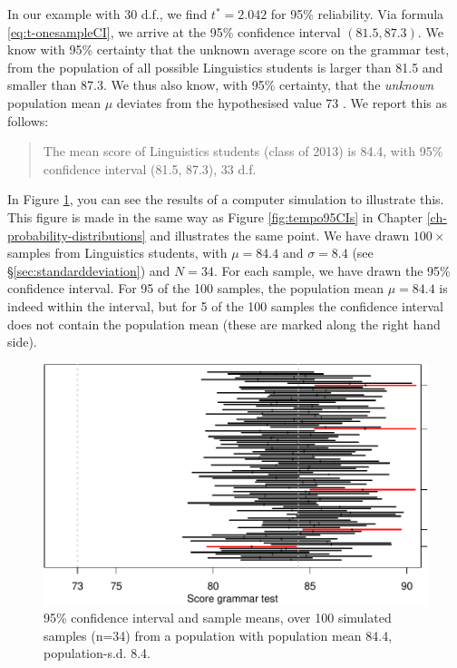\documentclass[
]{book}
\begin{document}
In our example with 30 d.f., we find \(t^*=2.042\) for 95\%
reliability. Via formula
\eqref{eq:t-onesampleCI}, we arrive at the 95\%
confidence interval \((81.5, 87.3)\). We know with 95\% certainty
that the unknown average score on the grammar test, from the population
of all possible Linguistics students is larger than 81.5 and
smaller than 87.3. We thus also know, with 95\% certainty, that the
\emph{unknown} population mean \(\mu\) deviates from the hypothesised
value 73 \citep{Cumm12}. We report this as follows:

\begin{quote}
The mean score of Linguistics students (class of 2013) is
84.4, with 95\% confidence interval (81.5, 87.3), 33 d.f.
\end{quote}

In Figure \ref{fig:gramm2013CIs}, you can see the results of
a computer simulation to illustrate this. This figure is made in the same way as Figure
\ref{fig:tempo95CIs} in Chapter \ref{ch-probability-distributions} and
illustrates the same point. We have drawn \(100\times\) samples from Linguistics students,
with \(\mu=84.4\) and \(\sigma=8.4\) (see §\ref{sec:standarddeviation}) and \(N=34\).
For each sample, we have drawn the 95\%
confidence interval. For 95 of the 100 samples, the population mean \(\mu=84.4\)
is indeed within the interval, but for 5 of the 100 samples the confidence interval does not contain the population mean (these are marked along the right hand side).

\begin{figure}
\centering
\includegraphics{QMS-EN_files/figure-latex/gramm2013CIs-1.pdf}
\caption{\label{fig:gramm2013CIs}95\% confidence interval and sample means, over 100 simulated samples (n=34) from a population with population mean 84.4, population-s.d. 8.4.}
\end{figure}
\end{document}

